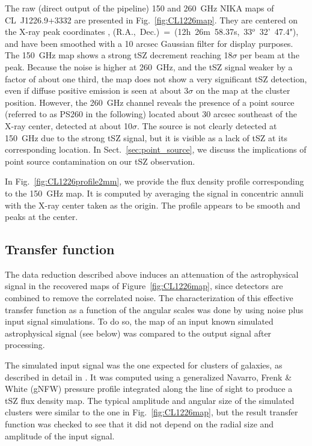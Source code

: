 \documentclass[twocolumn,traditabstract]{aa}
\begin{document}
The raw (direct output of the pipeline) 150 and 260~GHz NIKA maps of \mbox{CL~J1226.9+3332} are presented in Fig.~\ref{fig:CL1226map}. They are centered on the X-ray peak coordinates \citep[taken from][]{cavagnolo2009}, (R.A.,~Dec.)~=~(12h~26m~58.37s,~33$^o$~32'~47.4"), and have been smoothed with a 10 arcsec Gaussian filter for display purposes. The 150~GHz map shows a strong tSZ decrement reaching 18$\sigma$ per beam at the peak. Because the noise is higher at 260~GHz, and the tSZ signal weaker by a factor of about one third, the map does not show a very significant tSZ detection, even if diffuse positive emission is seen at about 3$\sigma$ on the map at the cluster position. However, the 260~GHz channel reveals the presence of a point source (referred to as PS260 in the following) located about 30 arcsec southeast of the \mbox{X-ray} center, detected at about 10$\sigma$. The source is not clearly detected at 150~GHz due to the strong tSZ signal, but it is visible as a lack of tSZ at its corresponding location. In Sect.~\ref{sec:point_source}, we discuss the implications of point source contamination on our tSZ observation.

In Fig.~\ref{fig:CL1226profile2mm}, we provide the flux density profile corresponding to the 150~GHz map. It is computed by averaging the signal in concentric annuli with the \mbox{X-ray} center taken as the origin. The profile appears to be smooth and peaks at the center.
	
\subsection{Transfer function}\label{sec:transfer_function}
The data reduction described above induces an attenuation of the astrophysical signal in the recovered maps of Figure~\ref{fig:CL1226map}, since detectors are combined to remove the correlated noise. The characterization of this effective transfer function as a function of the angular scales was done by using noise plus input signal simulations. To do so, the map of an input known simulated astrophysical signal (see below) was compared to the output signal after processing.

The simulated input signal was the one expected for clusters of galaxies, as described in detail in \citet{adam2013}. It was computed using a generalized Navarro, Frenk \& White (gNFW) pressure profile \citep[see Sec.~\ref{sec:icm_param_p},][]{nagai2007} integrated along the line of sight to produce a tSZ flux density map. The typical amplitude and angular size of the simulated clusters were similar to the one in Fig.~\ref{fig:CL1226map}, but the result transfer function was checked to see that it did not depend on the radial size and amplitude of the input signal.
\end{document}
